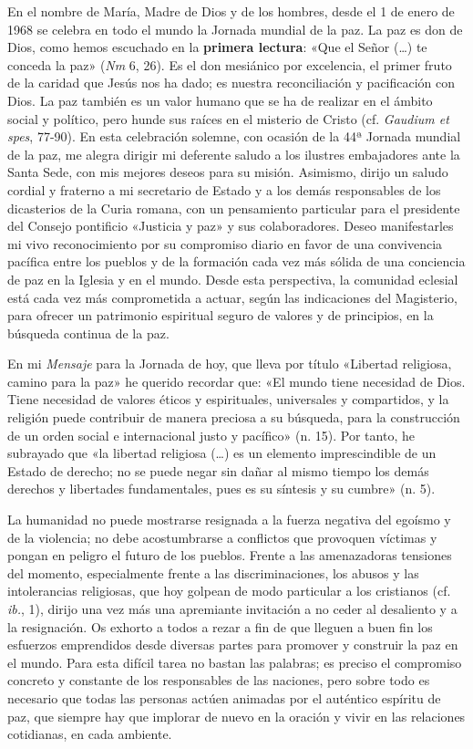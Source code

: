 \documentclass[]{article}
\begin{document}
En el nombre de María, Madre de Dios y de los hombres, desde el 1 de
enero de 1968 se celebra en todo el mundo la Jornada mundial de la paz.
La paz es don de Dios, como hemos escuchado en la \textbf{primera
lectura}: «Que el Señor (\ldots{}) te conceda la paz» (\emph{Nm} 6, 26).
Es el don mesiánico por excelencia, el primer fruto de la caridad que
Jesús nos ha dado; es nuestra reconciliación y pacificación con Dios. La
paz también es un valor humano que se ha de realizar en el ámbito social
y político, pero hunde sus raíces en el misterio de Cristo (cf.
\emph{Gaudium et spes}, 77-90). En esta celebración solemne, con ocasión
de la 44ª Jornada mundial de la paz, me alegra dirigir mi deferente
saludo a los ilustres embajadores ante la Santa Sede, con mis mejores
deseos para su misión. Asimismo, dirijo un saludo cordial y fraterno a
mi secretario de Estado y a los demás responsables de los dicasterios de
la Curia romana, con un pensamiento particular para el presidente del
Consejo pontificio «Justicia y paz» y sus colaboradores. Deseo
manifestarles mi vivo reconocimiento por su compromiso diario en favor
de una convivencia pacífica entre los pueblos y de la formación cada vez
más sólida de una conciencia de paz en la Iglesia y en el mundo. Desde
esta perspectiva, la comunidad eclesial está cada vez más comprometida a
actuar, según las indicaciones del Magisterio, para ofrecer un
patrimonio espiritual seguro de valores y de principios, en la búsqueda
continua de la paz.

En mi \emph{Mensaje} para la Jornada de hoy, que lleva por título
«Libertad religiosa, camino para la paz» he querido recordar que: «El
mundo tiene necesidad de Dios. Tiene necesidad de valores éticos y
espirituales, universales y compartidos, y la religión puede contribuir
de manera preciosa a su búsqueda, para la construcción de un orden
social e internacional justo y pacífico» (n. 15). Por tanto, he
subrayado que «la libertad religiosa (\ldots{}) es un elemento
imprescindible de un Estado de derecho; no se puede negar sin dañar al
mismo tiempo los demás derechos y libertades fundamentales, pues es su
síntesis y su cumbre» (n. 5).

La humanidad no puede mostrarse resignada a la fuerza negativa del
egoísmo y de la violencia; no debe acostumbrarse a conflictos que
provoquen víctimas y pongan en peligro el futuro de los pueblos. Frente
a las amenazadoras tensiones del momento, especialmente frente a las
discriminaciones, los abusos y las intolerancias religiosas, que hoy
golpean de modo particular a los cristianos (cf. \emph{ib.}, 1), dirijo
una vez más una apremiante invitación a no ceder al desaliento y a la
resignación. Os exhorto a todos a rezar a fin de que lleguen a buen fin
los esfuerzos emprendidos desde diversas partes para promover y
construir la paz en el mundo. Para esta difícil tarea no bastan las
palabras; es preciso el compromiso concreto y constante de los
responsables de las naciones, pero sobre todo es necesario que todas las
personas actúen animadas por el auténtico espíritu de paz, que siempre
hay que implorar de nuevo en la oración y vivir en las relaciones
cotidianas, en cada ambiente.
\end{document}
